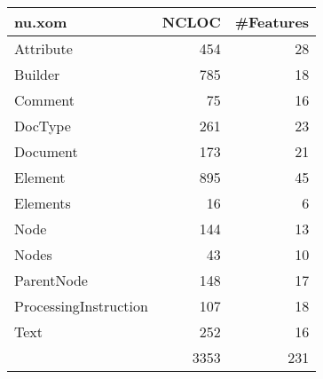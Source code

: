 \begin{tabular}{|l|r|r|}\hline
nu.xom & NCLOC & \#Features\\\hline\hline
Attribute & 454 & 28\\\hline
Builder & 785 & 18\\\hline
Comment & 75 & 16\\\hline
DocType & 261 & 23\\\hline
Document & 173 & 21\\\hline
Element & 895 & 45\\\hline
Elements & 16 & 6\\\hline
Node & 144 & 13\\\hline
Nodes & 43 & 10\\\hline
ParentNode & 148 & 17\\\hline
ProcessingInstruction & 107 & 18\\\hline
Text & 252 & 16\\\hline
\hline
 & 3353 & 231\\\hline
\end{tabular}
